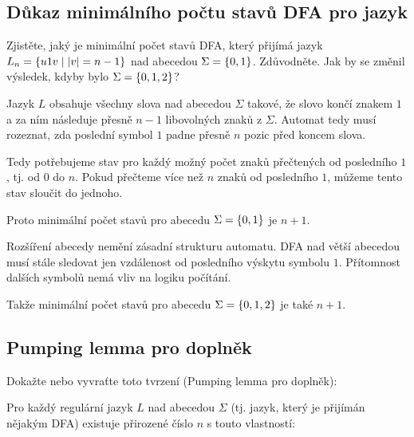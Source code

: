 
\subsection{Důkaz minimálního počtu stavů DFA pro jazyk}
Zjistěte, jaký je minimální počet stavů DFA, který přijímá jazyk $L_n = \left\lbrace u1v \mid |v|=n-1 \right\rbrace$ nad abecedou
$\Sigma = \left\lbrace 0,1 \right\rbrace$. Zdůvodněte. Jak by se změnil výsledek, kdyby bylo $\Sigma = \left\lbrace 0,1,2 \right\rbrace$?
\newline

Jazyk $L$ obsahuje všechny slova nad abecedou $\Sigma$ takové, že slovo končí znakem $1$ a za ním následuje přesně $n-1$
libovolných znaků z $\Sigma$. Automat tedy musí rozeznat, zda poslední symbol $1$ padne přesně $n$ pozic před koncem
slova.

Tedy potřebujeme stav pro každý možný počet znaků přečtených od posledního $1$, tj. od 0 do $n$. Pokud přečteme více než
$n$ znaků od posledního $1$, můžeme tento stav sloučit do jednoho.

Proto minimální počet stavů pro abecedu $\Sigma = \left\lbrace 0,1 \right\rbrace$ je $n+1$.

Rozšíření abecedy nemění zásadní strukturu automatu. DFA nad větší abecedou musí stále sledovat jen vzdálenost od
posledního výskytu symbolu $1$. Přítomnost dalších symbolů nemá vliv na logiku počítání.

Takže minimální počet stavů pro abecedu $\Sigma = \left\lbrace 0,1,2 \right\rbrace$ je také $n+1$.

\subsection{Pumping lemma pro doplněk} %
Dokažte nebo vyvraťte toto tvrzení (Pumping lemma pro doplněk):

Pro každý regulární jazyk $L$ nad abecedou $\Sigma$ (tj. jazyk, který je přijímán nějakým DFA) existuje přirozené číslo
$n$ s touto vlastností:

